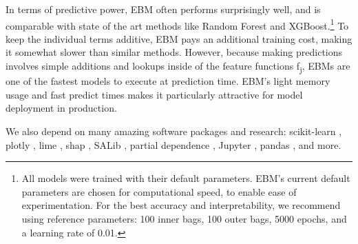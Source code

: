 \documentclass[twoside,11pt]{article}
\begin{document}
In terms of predictive power, EBM often performs surprisingly well, and is comparable with state of the art methods like Random Forest and XGBoost.\footnote{All models were trained with their default parameters. EBM's current default parameters are chosen for computational speed, to enable ease of experimentation. For the best accuracy and interpretability, we recommend using reference parameters: 100 inner bags, 100 outer bags, 5000 epochs, and a learning rate of 0.01.} To keep the individual terms additive, EBM pays an additional training cost, making it somewhat slower than similar methods. However, because making predictions involves simple additions and lookups inside of the feature functions f\textsubscript{j}, EBMs are one of the fastest models to execute at prediction time. EBM's light memory usage and fast predict times makes it particularly attractive for model deployment in production.  

\newpage
\newpage

 We also depend on many amazing software packages and research: scikit-learn \citep{scikit-learn}, plotly \citep{plotly}, lime \citep{lime}, shap \citep{NIPS2017_7062}, SALib \citep{Herman2017}, partial dependence \citep{friedman2001}, Jupyter \citep{Kluyver:2016aa}, pandas \citep{mckinneypandas}, and more.



\nocite{*}

\end{document}

